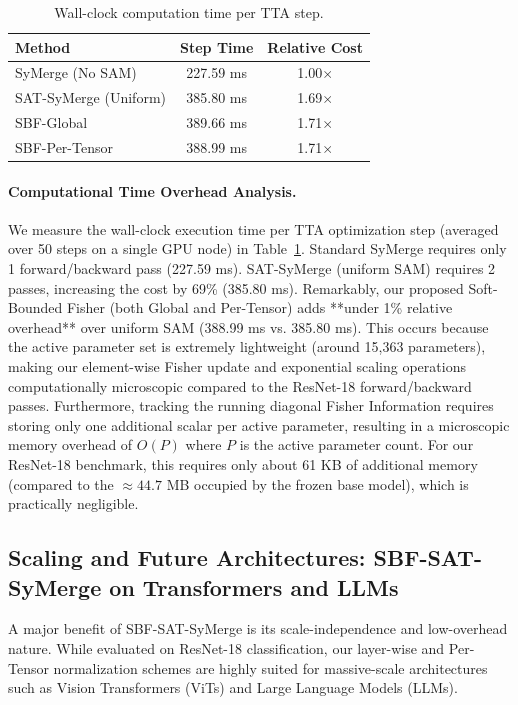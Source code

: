 \documentclass{article}
\theoremstyle{plain}
\theoremstyle{definition}
\theoremstyle{remark}
\begin{document}
\begin{table}[t]
\caption{Wall-clock computation time per TTA step.}
\label{tab:timing_benchmark}
\vskip 0.15in
\begin{center}
\begin{small}
\begin{sc}
\begin{tabular}{lcc}
\toprule
Method & Step Time & Relative Cost \\
\midrule
SyMerge (No SAM) & 227.59 ms & 1.00$\times$ \\
SAT-SyMerge (Uniform) & 385.80 ms & 1.69$\times$ \\
SBF-Global & 389.66 ms & 1.71$\times$ \\
SBF-Per-Tensor & 388.99 ms & 1.71$\times$ \\
\bottomrule
\end{tabular}
\end{sc}
\end{small}
\end{center}
\vskip -0.1in
\end{table}

\paragraph{Computational Time Overhead Analysis.}
We measure the wall-clock execution time per TTA optimization step (averaged over 50 steps on a single GPU node) in Table~\ref{tab:timing_benchmark}.
Standard SyMerge requires only 1 forward/backward pass (227.59 ms). SAT-SyMerge (uniform SAM) requires 2 passes, increasing the cost by 69\% (385.80 ms).
Remarkably, our proposed Soft-Bounded Fisher (both Global and Per-Tensor) adds **under 1\% relative overhead** over uniform SAM (388.99 ms vs. 385.80 ms). This occurs because the active parameter set is extremely lightweight (around 15,363 parameters), making our element-wise Fisher update and exponential scaling operations computationally microscopic compared to the ResNet-18 forward/backward passes. Furthermore, tracking the running diagonal Fisher Information requires storing only one additional scalar per active parameter, resulting in a microscopic memory overhead of $O(P)$ where $P$ is the active parameter count. For our ResNet-18 benchmark, this requires only about 61 KB of additional memory (compared to the $\approx 44.7$ MB occupied by the frozen base model), which is practically negligible.

\subsection{Scaling and Future Architectures: SBF-SAT-SyMerge on Transformers and LLMs}
\label{sec:scaling}
A major benefit of SBF-SAT-SyMerge is its scale-independence and low-overhead nature. While evaluated on ResNet-18 classification, our layer-wise and Per-Tensor normalization schemes are highly suited for massive-scale architectures such as Vision Transformers (ViTs) and Large Language Models (LLMs).
\end{document}
